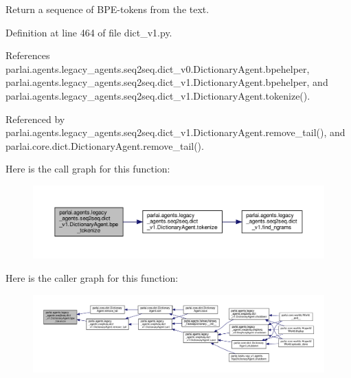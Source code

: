 \begin{DoxyVerb}Return a sequence of BPE-tokens from the text.\end{DoxyVerb}
 

Definition at line 464 of file dict\+\_\+v1.\+py.



References parlai.\+agents.\+legacy\+\_\+agents.\+seq2seq.\+dict\+\_\+v0.\+Dictionary\+Agent.\+bpehelper, parlai.\+agents.\+legacy\+\_\+agents.\+seq2seq.\+dict\+\_\+v1.\+Dictionary\+Agent.\+bpehelper, and parlai.\+agents.\+legacy\+\_\+agents.\+seq2seq.\+dict\+\_\+v1.\+Dictionary\+Agent.\+tokenize().



Referenced by parlai.\+agents.\+legacy\+\_\+agents.\+seq2seq.\+dict\+\_\+v1.\+Dictionary\+Agent.\+remove\+\_\+tail(), and parlai.\+core.\+dict.\+Dictionary\+Agent.\+remove\+\_\+tail().

Here is the call graph for this function\+:
\nopagebreak
\begin{figure}[H]
\begin{center}
\leavevmode
\includegraphics[width=350pt]{classparlai_1_1agents_1_1legacy__agents_1_1seq2seq_1_1dict__v1_1_1DictionaryAgent_aab883c9615677cd9ecfa921cd4994081_cgraph}
\end{center}
\end{figure}
Here is the caller graph for this function\+:
\nopagebreak
\begin{figure}[H]
\begin{center}
\leavevmode
\includegraphics[width=350pt]{classparlai_1_1agents_1_1legacy__agents_1_1seq2seq_1_1dict__v1_1_1DictionaryAgent_aab883c9615677cd9ecfa921cd4994081_icgraph}
\end{center}
\end{figure}
\mbox{\label{classparlai_1_1agents_1_1legacy__agents_1_1seq2seq_1_1dict__v1_1_1DictionaryAgent_ace20feec59a305f29680ba6167eda2f6}} 
